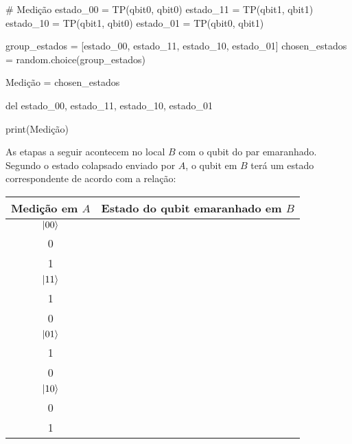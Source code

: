 \begin{pycode}
    # Medição
    estado_00 = TP(qbit0, qbit0)
    estado_11 = TP(qbit1, qbit1)
    estado_10 = TP(qbit1, qbit0)
    estado_01 = TP(qbit0, qbit1)

    group_estados = [estado_00, estado_11, estado_10, estado_01]
    chosen_estados = random.choice(group_estados)

    Medição = chosen_estados

    del estado_00, estado_11, estado_10, estado_01

    print(Medição)
\end{pycode}

As etapas a seguir acontecem no local \(B\) com o qubit do par emaranhado. Segundo o estado colapsado enviado por \(A\), o qubit em \(B\) terá um estado correspondente de acordo com a relação:
\begin{center}
  \begin{tabular}{cc}
    \toprule
    Medição em \(A\) & Estado do qubit emaranhado em \(B\) \\
    \midrule
    \(\ket{00}\) & \(\alpha \begin{bmatrix} 1 \\ 0 \end{bmatrix} + \beta \begin{bmatrix} 0 \\ 1 \end{bmatrix}\) \\
    \(\ket{11}\) & \(\alpha \begin{bmatrix} 0 \\ 1 \end{bmatrix} - \beta \begin{bmatrix} 1 \\ 0 \end{bmatrix}\) \\
    \(\ket{01}\) & \(\alpha \begin{bmatrix} 0 \\ 1 \end{bmatrix} + \beta \begin{bmatrix} 1 \\ 0 \end{bmatrix}\) \\
    \(\ket{10}\) & \(\alpha \begin{bmatrix} 1 \\ 0 \end{bmatrix} - \beta \begin{bmatrix} 0 \\ 1 \end{bmatrix}\) \\
    \bottomrule
  \end{tabular}
\end{center}

